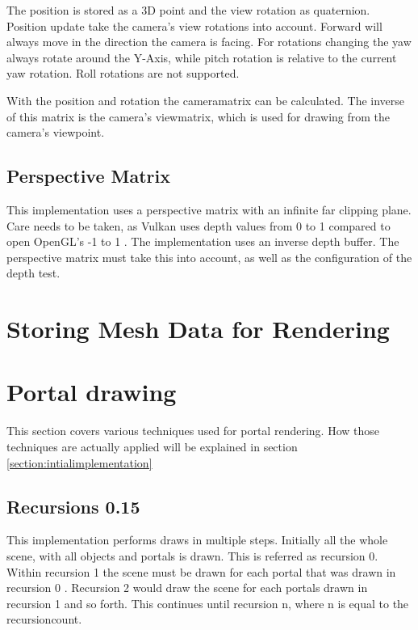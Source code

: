 The position is stored as a 3D point and the view rotation as quaternion. Position update take the camera's view rotations into account. Forward will always move in the direction the camera is facing. For rotations changing the yaw always rotate around the Y-Axis, while pitch rotation is relative to the current yaw rotation. Roll rotations are not supported.

With the position and rotation the \gls{cameramatrix} can be calculated. The inverse of this matrix is the camera's \gls{viewmatrix}, which is used for drawing from the camera's viewpoint.

\subsection{Perspective Matrix}
This implementation uses a perspective matrix with an infinite far clipping plane. Care needs to be taken, as Vulkan uses depth values from 0 to 1 \cite{khronos:vulkan:spec1.1} compared to open OpenGL's -1 to 1 \cite{khronos:openGL:spec4.6}. The implementation uses an inverse depth buffer. The perspective matrix must take this into account, as well as the configuration of the depth test.


\section{Storing Mesh Data for Rendering}


\section{Portal drawing}
\label{section:portaldrawing}

This section covers various techniques used for portal rendering. How those techniques are actually applied will be explained in section \ref{section:intialimplementation}

\subsection{Recursions 0.15}


This implementation performs draws in multiple steps. Initially all the whole scene, with all objects and portals is drawn. This is referred as recursion 0. Within recursion 1 the scene must be drawn for each portal that was drawn in recursion 0 . Recursion 2 would draw the scene for each portals drawn in recursion 1 and so forth. This continues until recursion n, where n is equal to the \gls{recursioncount}.


